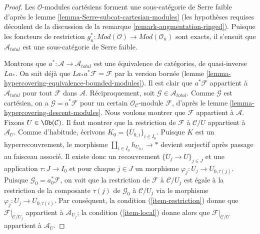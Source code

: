 \begin{proof}
Les $\mathcal{O}$-modules cartésiens forment une sous-catégorie de Serre faible d'après le
lemme \ref{lemma-Serre-subcat-cartesian-modules}
(les hypothèses requises découlent de la discussion de la
remarque \ref{remark-augmentation-ringed}).
Puisque les foncteurs de restriction
$g_n^* : \textit{Mod}(\mathcal{O}) \to \textit{Mod}(\mathcal{O}_n)$
sont exacts, il s'ensuit que $\mathcal{A}_{total}$ est une
sous-catégorie de Serre faible.

\medskip\noindent
Montrons que $a^* : \mathcal{A} \to \mathcal{A}_{total}$
est une équivalence de catégories, de quasi-inverse $La_*$.
On sait déjà que $La_*a^*\mathcal{F} = \mathcal{F}$ par la
version bornée
(lemme \ref{lemma-hypercovering-equivalence-bounded-modules}).
Il est clair que $a^*\mathcal{F}$ appartient à $\mathcal{A}_{total}$
pour tout $\mathcal{F}$ dans $\mathcal{A}$. Réciproquement, soit
$\mathcal{G} \in \mathcal{A}_{total}$. Comme $\mathcal{G}$
est cartésien, on a $\mathcal{G} = a^*\mathcal{F}$
pour un certain $\mathcal{O}_\mathcal{C}$-module $\mathcal{F}$, d'après le
lemme \ref{lemma-hypercovering-descent-modules}.
Nous voulons montrer que $\mathcal{F}$ appartient à $\mathcal{A}$.
Fixons $U \in \Ob(\mathcal{C})$. Il faut montrer que la restriction
de $\mathcal{F}$ à $\mathcal{C}/U$ appartient à $\mathcal{A}_U$.
Comme d'habitude, écrivons $K_0 = \{U_{0, i}\}_{i \in I_0}$.
Puisque $K$ est un hyperrecouvrement, le morphisme $\coprod_{i \in I_0} h_{U_{0, i}} \to *$
devient surjectif après passage au faisceau associé. Il existe donc
un recouvrement $\{U_j \to U\}_{j \in J}$ et une application $\tau : J \to I_0$
et pour chaque $j \in J$ un morphisme $\varphi_j : U_j \to U_{0, \tau(j)}$.
Puisque $\mathcal{G}_0 = a_0^*\mathcal{F}$, on voit
que la restriction de $\mathcal{F}$ à $\mathcal{C}/U_j$
est égale à la restriction de la composante $\tau(j)$ de
$\mathcal{G}_0$ à $\mathcal{C}/U_j$ via le morphisme
$\varphi_j : U_j \to U_{0, \tau(i)}$. Par conséquent,
la condition (\ref{item-restriction}) donne que $\mathcal{F}|_{\mathcal{C}/U_j}$
appartient à $\mathcal{A}_{U_j}$; la condition
(\ref{item-local}) donne alors que $\mathcal{F}|_{\mathcal{C}/U}$
appartient à $\mathcal{A}_U$.


\end{proof}
